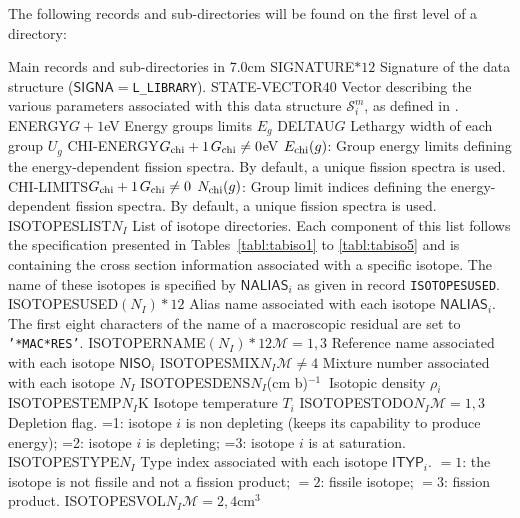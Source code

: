 The following records and sub-directories will be found on the first level of a 
directory:
\begin{DescriptionEnregistrement}{Main records and sub-directories in }{7.0cm}
\CharEnr
  {SIGNATURE}{$*12$}
  {Signature of the  data structure ($\mathsf{SIGNA}=${\tt L\_LIBRARY}).}
\IntEnr
  {STATE-VECTOR}{$40$}
  {Vector describing the various parameters associated with this data structure $\mathcal{S}^{m}_{i}$,
  as defined in .}
\RealEnr
  {ENERGY}{$G+1$}{eV}
  {Energy groups limits $E_{g}$}
\RealEnr
  {DELTAU}{$G$}{}
  {Lethargy width of each group $U_{g}$}
\OptRealEnr
  {CHI-ENERGY}{$G_{\rm chi}+1$}{$G_{\rm chi}\ne 0$}{eV}
  {$E_{\rm chi}(g)$: Group energy limits defining the energy-dependent fission spectra. By default, a unique fission spectra is used.}
\OptIntEnr
  {CHI-LIMITS}{$G_{\rm chi}+1$}{$G_{\rm chi}\ne 0$}
  {$N_{\rm chi}(g)$: Group limit indices defining the energy-dependent fission spectra. By default, a unique fission spectra is used.}
\DirlEnr
  {ISOTOPESLIST}{$N_{I}$}
  {List of {\sc isotope} directories. Each component of this list follows the  specification
  presented in Tables~\ref{tabl:tabiso1} to \ref{tabl:tabiso5} and is containing the cross section
  information associated with a specific isotope. The name of these isotopes is specified by 
  $\mathsf{NALIAS}_{i}$ as given in record {\tt ISOTOPESUSED}.}
\CharEnr
  {ISOTOPESUSED}{$(N_{I})*12$}
  {Alias name associated with each isotope $\mathsf{NALIAS}_{i}$. The first eight characters of the name of a macroscopic residual are set to {\tt '*MAC*RES'}.}
\OptCharEnr
  {ISOTOPERNAME}{$(N_{I})*12$}{$\mathcal{M}=1,3$}
  {Reference name associated with each isotope $\mathsf{NISO}_{i}$}
\OptIntEnr
  {ISOTOPESMIX}{$N_{I}$}{$\mathcal{M}\ne 4$}
  {Mixture number associated with each isotope $N_{I}$}
\RealEnr
  {ISOTOPESDENS}{$N_{I}$}{(cm b)$^{-1}\ $}
  {Isotopic density $\rho_{i}$}
\RealEnr
  {ISOTOPESTEMP}{$N_{I}$}{K}
  {Isotope temperature $T_{i}$}
\OptIntEnr
  {ISOTOPESTODO}{$N_{I}$}{$\mathcal{M}=1,3$}
  {Depletion flag. =1: isotope $i$ is non depleting (keeps its capability to produce energy); =2: isotope $i$ is depleting;
  =3: isotope $i$ is at saturation.}
\IntEnr
  {ISOTOPESTYPE}{$N_{I}$}
  {Type index associated with each isotope $\mathsf{ITYP}_{i}$. $=1$: the isotope is
  not fissile and not a fission product; $=2$: fissile isotope; $=3$: fission
  product.}
\OptRealEnr
  {ISOTOPESVOL}{$N_{I}$}{$\mathcal{M}=2, 4$}{cm$^{3}$}

\end{DescriptionEnregistrement}
